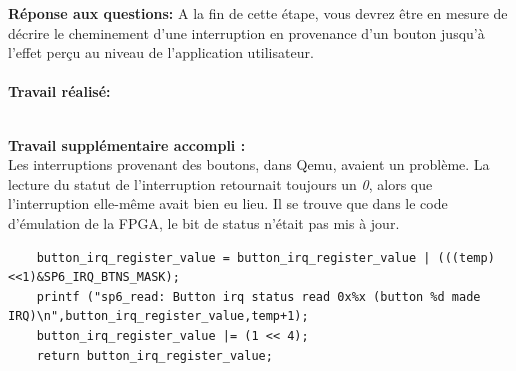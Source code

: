 \color{red}
\textbf{Réponse aux questions: }A la fin de cette étape, vous devrez être en mesure de décrire le cheminement d'une interruption
en provenance d'un bouton jusqu'à l'effet perçu au niveau de l’application utilisateur. \\\\
\textbf{Travail réalisé: }\\\\\color{black}

\textbf{Travail supplémentaire accompli :}\\
Les interruptions provenant des boutons, dans Qemu, avaient un problème. La lecture du statut de l'interruption retournait toujours un \textit{0}, alors que l'interruption elle-même avait bien eu lieu. Il se trouve que dans le code d'émulation de la FPGA, le bit de status n'était pas mis à jour.

\begin{lstlisting}
	button_irq_register_value = button_irq_register_value | (((temp)<<1)&SP6_IRQ_BTNS_MASK);
	printf ("sp6_read: Button irq status read 0x%x (button %d made IRQ)\n",button_irq_register_value,temp+1);
	button_irq_register_value |= (1 << 4);
	return button_irq_register_value;
\end{lstlisting}